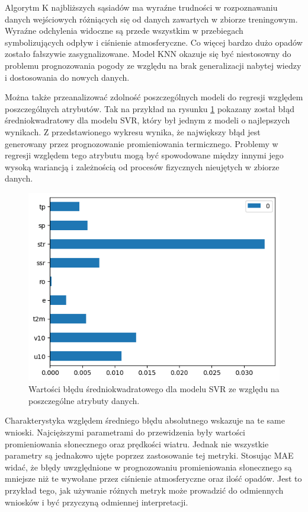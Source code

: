 Algorytm K najbliższych sąsiadów ma wyraźne trudności w rozpoznawaniu danych wejściowych różniących się od 
danych zawartych w zbiorze treningowym. Wyraźne odchylenia widoczne są przede wszystkim w przebiegach  
symbolizujących odpływ i ciśnienie atmosferyczne. Co więcej bardzo dużo opadów zostało fałszywie
zasygnalizowane. Model KNN okazuje się być niestosowny do problemu prognozowania pogody ze względu
na brak generalizacji nabytej wiedzy i dostosowania do nowych danych.

\pagebreak

Można także przeanalizować zdolność poszczególnych modeli do regresji względem poszczególnych atrybutów.
Tak na przykład na rysunku \ref{svr-mse-bar} pokazany został błąd średniokwadratowy dla modelu SVR, który był
jednym z modeli o najlepszych wynikach. Z przedstawionego wykresu wynika, że największy błąd jest generowany
przez prognozowanie promieniowania termicznego. Problemy w regresji względem tego atrybutu mogą być  
spowodowane między innymi jego wysoką wariancją i zależnością od procesów fizycznych nieujętych w zbiorze 
danych.

\begin{figure}[H]
    \centering
    \includegraphics[width=\textwidth]{images/svr_mse_bar.png}
    \caption{Wartości błędu średniokwadratowego dla modelu SVR ze względu na poszczególne atrybuty danych.}
    \label{svr-mse-bar}
\end{figure}

Charakterystyka względem średniego błędu absolutnego wskazuje na te same wnioski. Najcięższymi parametrami
do przewidzenia były wartości promieniowania słonecznego oraz prędkości wiatru. Jednak nie wszystkie
parametry są jednakowo ujęte poprzez zastosowanie tej metryki. Stosując MAE widać, że błędy 
uwzględnione w prognozowaniu promieniowania słonecznego są mniejsze niż te wywołane przez ciśnienie
atmosferyczne oraz ilość opadów. Jest to przykład tego, jak używanie różnych metryk może prowadzić do 
odmiennych wniosków i być przyczyną odmiennej interpretacji.

